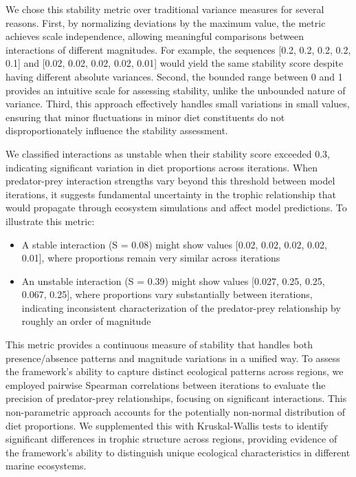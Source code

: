 We chose this stability metric over traditional variance measures for several reasons. First, by normalizing deviations by the maximum value, the metric achieves scale independence, allowing meaningful comparisons between interactions of different magnitudes. For example, the sequences [0.2, 0.2, 0.2, 0.2, 0.1] and [0.02, 0.02, 0.02, 0.02, 0.01] would yield the same stability score despite having different absolute variances. Second, the bounded range between 0 and 1 provides an intuitive scale for assessing stability, unlike the unbounded nature of variance. Third, this approach effectively handles small variations in small values, ensuring that minor fluctuations in minor diet constituents do not disproportionately influence the stability assessment.

We classified interactions as unstable when their stability score exceeded 0.3, indicating significant variation in diet proportions across iterations. When predator-prey interaction strengths vary beyond this threshold between model iterations, it suggests fundamental uncertainty in the trophic relationship that would propagate through ecosystem simulations and affect model predictions. To illustrate this metric:

\begin{itemize}
    \item A stable interaction (S = 0.08) might show values [0.02, 0.02, 0.02, 0.02, 0.01], where proportions remain very similar across iterations
    \item An unstable interaction (S = 0.39) might show values [0.027, 0.25, 0.25, 0.067, 0.25], where proportions vary substantially between iterations, indicating inconsistent characterization of the predator-prey relationship by roughly an order of magnitude
\end{itemize}

This metric provides a continuous measure of stability that handles both presence/absence patterns and magnitude variations in a unified way. To assess the framework's ability to capture distinct ecological patterns across regions, we employed pairwise Spearman correlations between iterations to evaluate the precision of predator-prey relationships, focusing on significant interactions. This non-parametric approach accounts for the potentially non-normal distribution of diet proportions. We supplemented this with Kruskal-Wallis tests to identify significant differences in trophic structure across regions, providing evidence of the framework's ability to distinguish unique ecological characteristics in different marine ecosystems.

